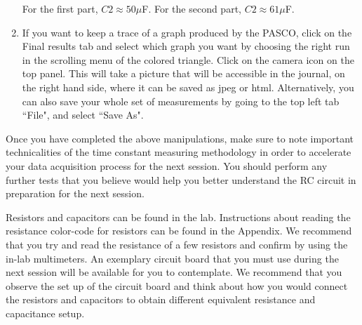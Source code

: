 \documentclass[12pt]{report}
\begin{document}
\begin{enumerate}
\begin{tcolorbox}[title=Answer]
For the first part, $C2 \approx 50\mu$F. For the second part, $C2 \approx 61\mu$F.
\end{tcolorbox}

\item If you want to keep a trace of a graph produced by the PASCO, click on the Final results tab and select which graph you want by choosing the right run in the scrolling menu of the colored triangle. Click on the camera icon on the top panel. This will take a picture that will be accessible in the journal, on the right hand side, where it can be saved as jpeg or html. Alternatively, you can also save your whole set of measurements by going to the top left tab ``File", and select ``Save As".
\end{enumerate}

Once you have completed the above manipulations, make sure to note important technicalities of the time constant measuring methodology in order to accelerate your data acquisition process for the next session. You should perform any further tests that you believe would help you better understand the RC circuit in preparation for the next session.

Resistors and capacitors can be found in the lab. Instructions about reading the resistance color-code for resistors can be found in the Appendix. We recommend that you try and read the resistance of a few resistors and confirm by using the in-lab multimeters. An exemplary circuit board that you must use during the next session will be available for you to contemplate. We recommend that you observe the set up of the circuit board and think about how you would connect the resistors and capacitors to obtain different equivalent resistance and capacitance setup.
\end{document}
